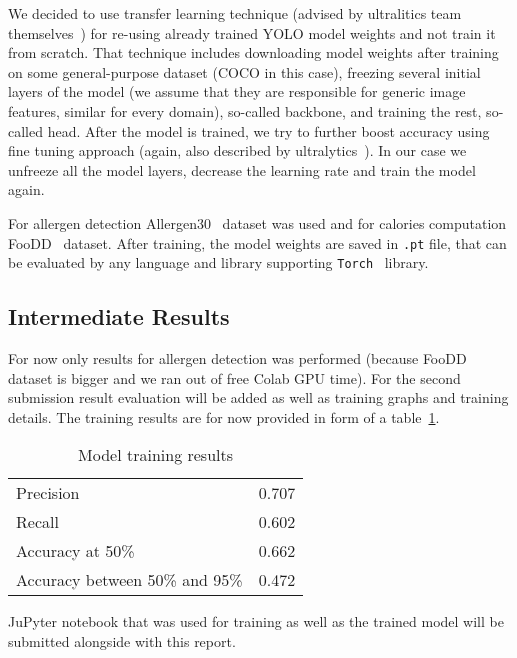 \documentclass[10pt,twocolumn,letterpaper]{article}
\begin{document}
We decided to use transfer learning technique (advised by ultralitics team themselves~\cite{ultralytics2024transferlearning}) for re-using already trained YOLO model weights and not train it from scratch.
That technique includes downloading model weights after training on some general-purpose dataset (COCO in this case), freezing several initial layers of the model (we assume that they are responsible for generic image features, similar for every domain), so-called backbone, and training the rest, so-called head.
After the model is trained, we try to further boost accuracy using fine tuning approach (again, also described by ultralytics~\cite{ultralytics2024finetuning}).
In our case we unfreeze all the model layers, decrease the learning rate and train the model again.

For allergen detection Allergen30~\cite{mishra2022allergen30} dataset was used and for calories computation FooDD~\cite{yvk7qk3820} dataset.
After training, the model weights are saved in \texttt{.pt} file, that can be evaluated by any language and library supporting \texttt{Torch}~\cite{torchlibrary} library.

\subsection{Intermediate Results}

For now only results for allergen detection was performed (because FooDD dataset is bigger and we ran out of free Colab GPU time).
For the second submission result evaluation will be added as well as training graphs and training details.
The training results are for now provided in form of a table~\ref{results-table}.

\begin{table}[!h]
    \begin{center}
        \caption{Model training results}\label{results-table}
        \begin{tabular}{ l c }
            \toprule
            Precision & 0.707 \\
            Recall & 0.602 \\
            Accuracy at 50\% & 0.662 \\
            Accuracy between 50\% and 95\% & 0.472 \\
            \bottomrule
        \end{tabular}
    \end{center}
\end{table}

JuPyter notebook that was used for training as well as the trained model will be submitted alongside with this report.
\end{document}
